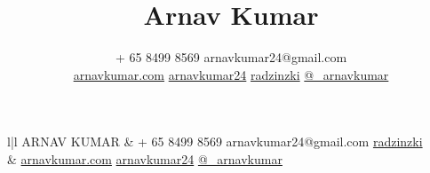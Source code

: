 \documentclass[11pt, letter]{article}
\title{Arnav Kumar}
\author{ \faMobilePhone {} + 65 8499 8569 \textbullet{} \faEnvelope {} arnavkumar24@gmail.com \\
\faExternalLink{ }\href{http://arnavkumar.com.com}{arnavkumar.com} \textbullet{}
\faLinkedinSign{ }\href{http://sg.linkedin.com/in/arnavkumar24/}{arnavkumar24} \textbullet{}
\faGithubSign{ }\href{https://github.com/radzinzki}{radzinzki} \textbullet{}
\faTwitterSign{ }\href{http://twitter.com/\_arnavkumar}{@\_arnavkumar} }
\date{} %
\begin{document}
\begin{tabular}{ l|l }
  {
    {\titlefont\fontsize{35pt}{22pt}\selectfont
      ARNAV KUMAR
    }
  }
&
\faMobilePhone {} + 65 8499 8569 \textbullet{}
\faEnvelope {} arnavkumar24@gmail.com \textbullet{}
\faGithubSign{ }\href{https://github.com/radzinzki}{radzinzki}
\\
&
\faExternalLink{ }\href{http://arnavkumar.com.com}{arnavkumar.com} \textbullet{}
\faLinkedinSign{ }\href{http://sg.linkedin.com/in/arnavkumar24/}{arnavkumar24} \textbullet{}
\faTwitterSign{ }\href{http://twitter.com/\_arnavkumar}{@\_arnavkumar}
\\
\end{tabular}




\end{document}
